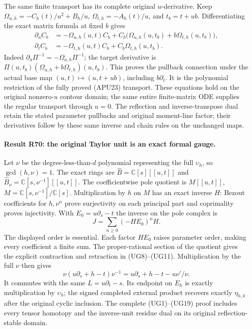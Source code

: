 The same finite transport has its complete original
\(u\)-derivative. Keep \(\Omega_{u,h}=-C_h(t)/u^2+B_h/u\),
\(\Omega_{t,h}=-A_h(t)/u\), and \(t_b=t+ub\).
Differentiating the exact matrix formula at fixed \(b\) gives
\[
 \begin{aligned}
 \partial_u C_b&=-\Omega_{u,h}(u,t)C_b+
 C_b\bigl(\Omega_{u,h}(u,t_b)+b\Omega_{t,h}(u,t_b)\bigr),\\
 \partial_t C_b&=-\Omega_{t,h}(u,t)C_b+
                          C_b\Omega_{t,h}(u,t_b).
 \end{aligned}
\]
Indeed \(\partial_a\Pi^{-1}=-\Omega_{a,h}\Pi^{-1}\);
the target derivative is
\(\Pi(u,t_b)(\Omega_{u,h}+b\Omega_{t,h})(u,t_b)\).
This proves the pullback connection under the actual base map
\((u,t)\mapsto(u,t+ub)\), including \(b\partial_t\).
It is the polynomial restriction of the fully proved (APU23)
transport. These equations hold on the original nonzero-\(u\)
contour domain; the same entire finite-matrix ODE supplies the
regular transport through \(u=0\). The reflection and
inverse-transpose dual retain the stated parameter pullbacks
and original moment-line factor; their derivatives follow by
these same inverse and chain rules on the unchanged maps.


\paragraph{Result R70: the original Taylor unit is an exact formal gauge.}
Let $\nu$ be the degree-less-than-$d$ polynomial representing
the full $\upsilon_h$, so $\gcd(h,\nu)=1$. The exact rings are
$\widehat B=\mathbb C[s][[u,t]]$ and
$\widehat B_\nu=\mathbb C[s,\nu^{-1}][[u,t]]$.
The coefficientwise pole quotient is
$M[[u,t]]$, $M=\mathbb C[s,\nu^{-1}]/\mathbb C[s]$.
Multiplication by $h$ on $M$ has an exact inverse $H$:
Bezout coefficients for $h,\nu^n$ prove surjectivity on each
principal part and coprimality proves injectivity.
With $E_0=u\partial_s-t$ the inverse on the pole complex is
\[
J=\sum_{n\ge0}(-HE_0)^nH.
\]
The displayed order is essential. Each factor $HE_0$ raises
parameter order, making every coefficient a finite sum.
The proper-rational section of the quotient gives the explicit
contraction and retraction in (UG8)--(UG11). Multiplication
by the full $\nu$ then gives
\[
\nu(u\partial_s+h-t)\nu^{-1}
=u\partial_s+h-t-u\nu'/\nu.
\]
It commutes with the same $L=u\partial_t-s$. Its endpoint
on $E_h$ is exactly multiplication by $\upsilon_h$; the
signed completed external product recovers exactly
$\eta_{h,k}$ after the original cyclic inclusion.
The complete (UG1)--(UG19) proof includes every tensor
homotopy and the inverse-unit residue dual on its original
reflection-stable domain.

